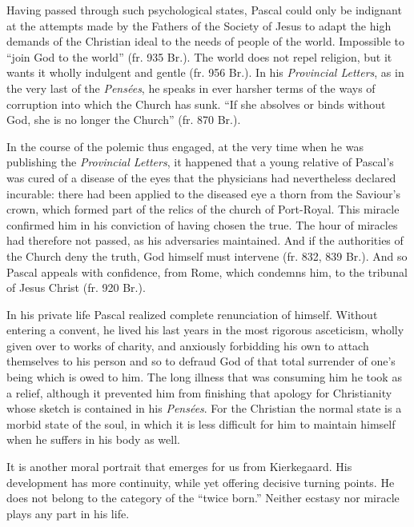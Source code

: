 \documentclass[12pt,a4paper]{article}
\begin{document}
Having passed through such psychological states, Pascal could only be indignant
at the attempts made by the Fathers of the Society of Jesus to adapt the high
demands of the Christian ideal to the needs of people of the world. Impossible
to ``join God to the world'' (fr. 935 Br.). The world does not repel religion,
but it wants it wholly indulgent and gentle (fr. 956 Br.). In his \emph{Provincial
Letters}, as in the very last of the \emph{Pensées}, he speaks in
ever harsher terms of the ways of corruption into which the Church has sunk.
``If she absolves or binds without God, she is no longer the Church'' (fr. 870
Br.).

In the course of the polemic thus engaged, at the very time when he was
publishing the \emph{Provincial Letters}, it happened that a young relative of
Pascal's was cured of a disease of the eyes that the physicians had nevertheless
declared incurable: there had been applied to the diseased eye a thorn from the
Saviour's crown, which formed part of the relics of the church of Port-Royal.
This miracle confirmed him in his conviction of having chosen the true. The hour
of miracles had therefore not passed, as his adversaries maintained. And if the
authorities of the Church deny the truth, God himself must intervene (fr. 832,
839 Br.). And so Pascal appeals with confidence, from Rome, which condemns him,
to the tribunal of Jesus Christ (fr. 920 Br.).

In his private life Pascal realized complete renunciation of himself. Without
entering a convent, he lived his last years in the most rigorous asceticism,
wholly given over to works of charity, and anxiously forbidding his own to
attach themselves to his person and so to defraud God of that total surrender
of one's being which is owed to him. The long illness that was consuming him he
took as a relief, although it prevented him from finishing that apology for
Christianity whose sketch is contained in his \emph{Pensées}. For the Christian
the normal state is a morbid state of the soul, in which it is less difficult
for him to maintain himself when he suffers in his body as well.

\bigskip

It is another moral portrait that emerges for us from Kierkegaard. His
development has more continuity, while yet offering decisive turning points. He
does not belong to the category of the ``twice born.'' Neither ecstasy nor
miracle plays any part in his life.
\end{document}
